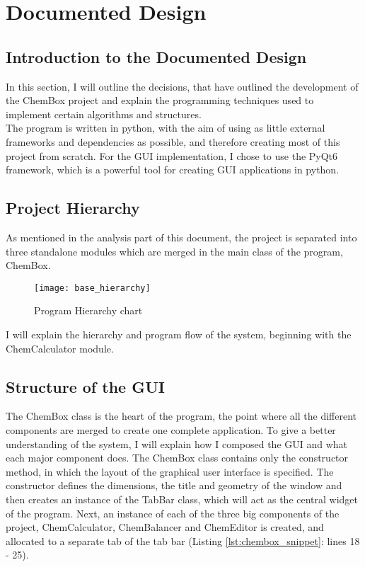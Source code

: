 \documentclass[a4paper,12pt]{article}
\begin{document}
\newpage

\section{Documented Design}

\subsection{Introduction to the Documented Design}

In this section, I will outline the decisions, that have outlined the development of the ChemBox project and explain the programming techniques used to implement certain algorithms and structures.\\
The program is written in python, with the aim of using as little external frameworks and dependencies as possible, and therefore creating most of this project from scratch. For the GUI implementation, I chose to use the PyQt6 framework, which is a powerful tool for creating GUI applications in python.\\

\subsection{Project Hierarchy}

As mentioned in the analysis part of this document, the project is separated into three standalone modules which are merged in the main class of the program, ChemBox.

\begin{figure} [h]
	\centering
	\texttt{[image: base\_hierarchy]}
	\caption{Program Hierarchy chart}
	\label{fig:tabs_mockup}
\end{figure}

I will explain the hierarchy and program flow of the system, beginning with the ChemCalculator module.
\newpage

\subsection{Structure of the GUI}

The ChemBox class is the heart of the program, the point where all the different components are merged to create one complete application. To give a better understanding of the system, I will explain how I composed the GUI and what each major component does. The ChemBox class contains only the constructor method, in which the layout of the graphical user interface is specified. The constructor defines the dimensions, the title and geometry of the window and then creates an instance of the TabBar class, which will act as the central widget of the program. Next, an instance of each of the three big components of the project, ChemCalculator, ChemBalancer and ChemEditor is created, and allocated to a separate tab of the tab bar (Listing \ref{lst:chembox_snippet}: lines 18 - 25).
\end{document}
